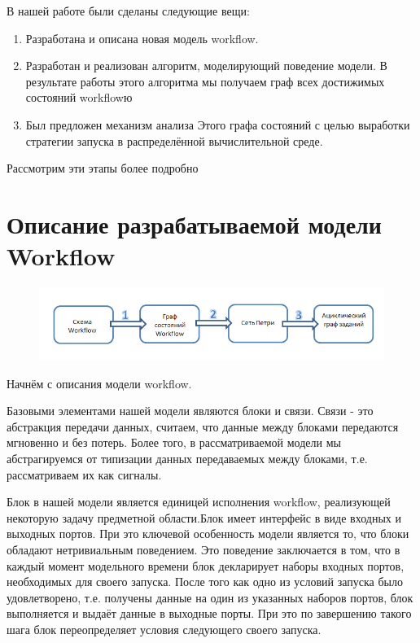 \documentclass[a4paper,14pt]{article}
\begin{document}
 В нашей работе были сделаны следующие вещи:
\begin{enumerate}
\item Разработана и описана новая модель workflow.
\item Разработан и реализован алгоритм, моделирующий поведение модели. В результате работы этого алгоритма мы получаем граф всех достижимых состояний workflowю
\item Был предложен механизм анализа Этого графа состояний с целью выработки стратегии запуска в распределённой вычислительной среде.
\end{enumerate}
Рассмотрим эти этапы более подробно  
 
\section{Описание разрабатываемой модели Workflow}
\begin{figure}[here]
    \centering
    \includegraphics[width=\textwidth]{analys_plan.png}

    \label{img:opt_wf}
\end{figure}
Начнём с описания модели workflow.


Базовыми элементами нашей модели являются блоки и связи.
  Связи - это абстракция передачи данных, считаем, что данные между блоками передаются мгновенно и без потерь.
  Более того, в рассматриваемой модели мы абстрагируемся от типизации данных передаваемых между блоками, т.е. рассматриваем их как сигналы.
  
  Блок в нашей модели является единицей исполнения workflow,  реализующей некоторую задачу предметной области.Блок имеет интерфейс в виде входных и выходных портов. При это ключевой особенность модели является то, что блоки обладают нетривиальным поведением. Это поведение заключается в том, что в каждый момент модельного времени блок  декларирует наборы входных портов, необходимых для своего запуска. После того как одно из условий запуска было удовлетворено, т.е. получены данные на один из указанных наборов портов, блок выполняется и выдаёт данные в выходные порты. При это по завершению такого шага блок переопределяет условия следующего своего запуска.
  
\end{document}
